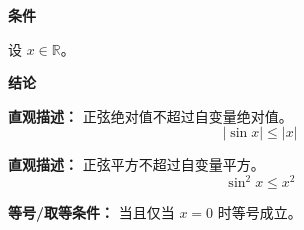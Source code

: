 \begin{statementbox}
\textbf{\textcolor{CStatement}{条件}}
\begin{description}[style=nextline, leftmargin=2.8em, labelsep=0.5em, itemsep=0.35em]
    \item[\textbf{\textcolor{CStatement}{条件 1（实数范围）：}}] 设 $x \in \mathbb{R}$。
\end{description}

\textbf{\textcolor{CStatement}{结论}}
\begin{description}[style=nextline, leftmargin=2.8em, labelsep=0.5em, itemsep=0.45em]
    \item[\textbf{\textcolor{CStatement}{结论一（绝对值不等式）：}}]
    \textbf{\textcolor{CStatement}{直观描述：}} 正弦绝对值不超过自变量绝对值。
    \[
    |\sin x| \leq |x|
    \]

    \item[\textbf{\textcolor{CStatement}{推广结论（平方形式）：}}]
    \textbf{\textcolor{CStatement}{直观描述：}} 正弦平方不超过自变量平方。
    \[
    \sin^2 x \leq x^2
    \]
\end{description}

\textbf{\textcolor{CStatement}{等号/取等条件：}} 当且仅当 $x = 0$ 时等号成立。
\end{statementbox}
